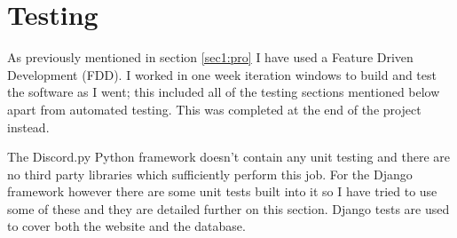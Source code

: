 \chapter{Testing}







As previously mentioned in section \ref{sec1:pro} I have used a Feature Driven Development (FDD). I worked in one week iteration windows to build and test the software as I went; this included all of the testing sections mentioned below apart from automated testing. This was completed at the end of the project instead.

The Discord.py Python framework doesn't contain any unit testing and there are no third party libraries which sufficiently perform this job. For the Django framework however there are some unit tests built into it so I have tried to use some of these and they are detailed further on this section. Django tests are used to cover both the website and the database. 


